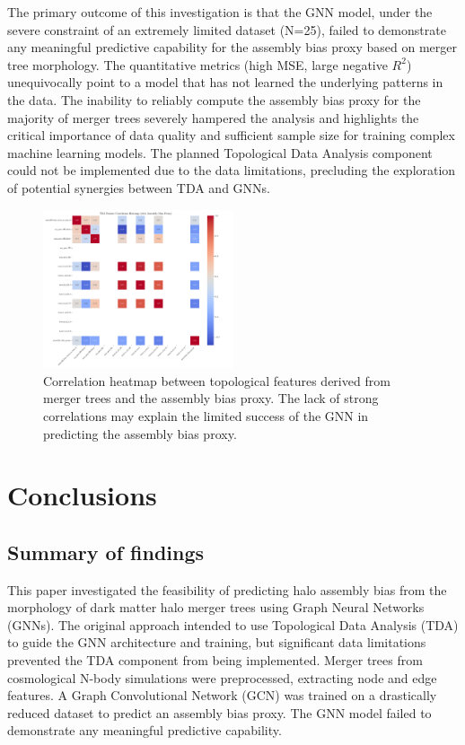 \documentclass[twocolumn]{aastex631}
\begin{document}
The primary outcome of this investigation is that the GNN model, under the severe constraint of an extremely limited dataset (N=25), failed to demonstrate any meaningful predictive capability for the assembly bias proxy based on merger tree morphology. The quantitative metrics (high MSE, large negative $R^2$) unequivocally point to a model that has not learned the underlying patterns in the data. The inability to reliably compute the assembly bias proxy for the majority of merger trees severely hampered the analysis and highlights the critical importance of data quality and sufficient sample size for training complex machine learning models. The planned Topological Data Analysis component could not be implemented due to the data limitations, precluding the exploration of potential synergies between TDA and GNNs.

\begin{figure}[htbp]
    \centering
    \includegraphics[width=0.5\textwidth]{../input_files/plots/tda_feature_correlation_heatmap_3_1748137556.png}
    \caption{\label{fig:tda_correlation}Correlation heatmap between topological features derived from merger trees and the assembly bias proxy. The lack of strong correlations may explain the limited success of the GNN in predicting the assembly bias proxy.}
\end{figure}

\section{Conclusions}
\label{sec:conclusions}
\subsection{Summary of findings}

This paper investigated the feasibility of predicting halo assembly bias from the morphology of dark matter halo merger trees using Graph Neural Networks (GNNs). The original approach intended to use Topological Data Analysis (TDA) to guide the GNN architecture and training, but significant data limitations prevented the TDA component from being implemented. Merger trees from cosmological N-body simulations were preprocessed, extracting node and edge features. A Graph Convolutional Network (GCN) was trained on a drastically reduced dataset to predict an assembly bias proxy. The GNN model failed to demonstrate any meaningful predictive capability.
\end{document}
